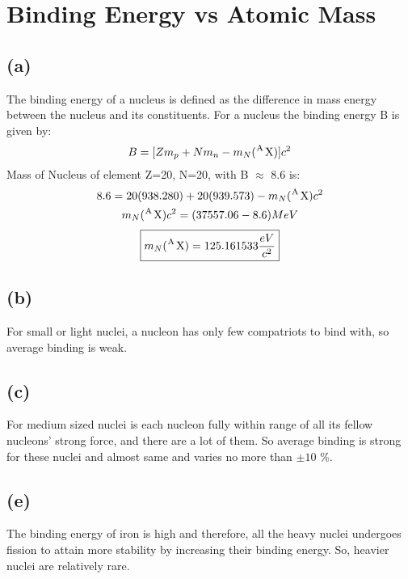 \documentclass[11pt, a4paper]{article}
\begin{document}
\section{Binding Energy vs Atomic Mass}
\label{sec:1.3}
\subsection*{(a)}
The binding energy of a nucleus is defined as the difference in mass energy between the nucleus and its constituents. 
For a nucleus  the binding energy B is given by:
\begin{equation}
    B = [Z m_p  + N m_n - m_N(\ce{^A X})]c^2
\end{equation}
Mass of Nucleus of element Z=20, N=20, with B \(\approx\) 8.6 is:
\begin{gather}
    8.6 = 20(938.280)+20(939.573) -  m_N(\ce{^A X})c^2\\
    m_N(\ce{^A X}) c^2= (37557.06 - 8.6) MeV\\
\end{gather}
\begin{equation}
    \boxed{m_N(\ce{^A X}) = 125.161533 \frac{eV}{c^2}}
\end{equation}
\subsection*{(b)}
For small or light nuclei, a nucleon has only few compatriots to bind with, so average binding is weak.
\subsection*{(c)}
For medium sized nuclei is each nucleon fully within range of all its fellow nucleons' strong force, and there are a lot of them. So average binding is strong for these nuclei and almost same and varies no more than \(\pm 10 \) \%.
\subsection*{(e)}
The binding energy of iron is high and therefore, all the heavy nuclei undergoes fission to attain more stability by increasing their binding energy. So, heavier nuclei are relatively rare.
\end{document}
